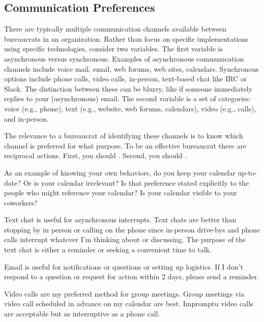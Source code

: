 \subsection{Communication Preferences}

There are typically multiple communication channels available between bureaucrats in an organization. Rather than focus on specific implementations using specific technologies, consider two variables. The first variable is asynchronous versus synchronous. Examples of asynchronous communication channels include voice mail, email, web forums, web sites, calendars. Synchronous options include phone calls, video calls, in-person, text-based chat like IRC or Slack. The distinction between these can be blurry, like if someone immediately replies to your (asynchronous) email.  The second variable is a set of categories: voice (e.g., phone), text (e.g., website, web forums, calendars), video (e.g., calls), and in-person. 


The relevance to a bureaucrat of identifying these channels is to know which channel is preferred for what purpose. To be an effective bureaucrat there are reciprocal actions. First, you should . Second, you should .

As an example of knowing your own behaviors, do you keep your calendar up-to-date? Or is your calendar irrelevant? Is that preference stated explicitly to the people who might reference your calendar? Is your calendar visible to your coworkers?

Text chat is useful for asynchronous interrupts. Text chats are better than stopping by in person or calling on the phone since in-person drive-bys and phone calls interrupt whatever I'm thinking about or discussing. The purpose of the text chat is either a reminder or seeking a convenient time to talk. 

Email is useful for notifications or questions or setting up logistics. If I don't respond to a question or request for action within 2 days, please send a reminder. 

Video calls are my preferred method for group meetings. Group meetings via video call scheduled in advance on my calendar are best. Impromptu video calls are acceptable but as interruptive as a phone call. 


